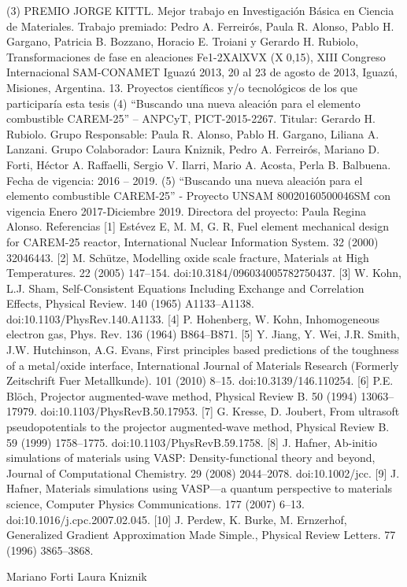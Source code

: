    (3)  PREMIO JORGE KITTL. Mejor trabajo en Investigación Básica en Ciencia de Materiales. Trabajo premiado: Pedro A. Ferreirós, Paula R. Alonso, Pablo H. Gargano, Patricia B. Bozzano, Horacio E. Troiani y Gerardo H. Rubiolo, Transformaciones de fase en aleaciones Fe1-2XAlXVX (X0,15), XIII Congreso Internacional SAM-CONAMET Iguazú 2013, 20 al 23 de agosto de 2013, Iguazú, Misiones, Argentina.
13. Proyectos científicos y/o tecnológicos de los que participaría esta tesis 
    (4) “Buscando una nueva aleación para el elemento combustible CAREM-25” – ANPCyT, PICT-2015-2267. Titular: Gerardo H. Rubiolo. Grupo Responsable: Paula R. Alonso, Pablo H. Gargano, Liliana A. Lanzani. Grupo Colaborador: Laura Kniznik, Pedro A. Ferreirós, Mariano D. Forti, Héctor A. Raffaelli, Sergio V. Ilarri, Mario A. Acosta, Perla B. Balbuena. Fecha de vigencia: 2016 – 2019.
    (5) “Buscando una nueva aleación para el elemento combustible CAREM-25” - Proyecto UNSAM 80020160500046SM con vigencia Enero 2017-Diciembre 2019. Directora del proyecto: Paula Regina Alonso.
       Referencias
[1]	Estévez E, M. M, G. R, Fuel element mechanical design for CAREM-25 reactor, International Nuclear Information System. 32 (2000) 32046443.
[2]	M. Schütze, Modelling oxide scale fracture, Materials at High Temperatures. 22 (2005) 147–154. doi:10.3184/096034005782750437.
[3]	W. Kohn, L.J. Sham, Self-Consistent Equations Including Exchange and Correlation Effects, Physical Review. 140 (1965) A1133–A1138. doi:10.1103/PhysRev.140.A1133.
[4]	P. Hohenberg, W. Kohn, Inhomogeneous electron gas, Phys. Rev. 136 (1964) B864–B871.
[5]	Y. Jiang, Y. Wei, J.R. Smith, J.W. Hutchinson, A.G. Evans, First principles based predictions of the toughness of a metal/oxide interface, International Journal of Materials Research (Formerly Zeitschrift Fuer Metallkunde). 101 (2010) 8–15. doi:10.3139/146.110254.
[6]	P.E. Blöch, Projector augmented-wave method, Physical Review B. 50 (1994) 13063–17979. doi:10.1103/PhysRevB.50.17953.
[7]	G. Kresse, D. Joubert, From ultrasoft pseudopotentials to the projector augmented-wave method, Physical Review B. 59 (1999) 1758–1775. doi:10.1103/PhysRevB.59.1758.
[8]	J. Hafner, Ab-initio simulations of materials using VASP: Density-functional theory and beyond, Journal of Computational Chemistry. 29 (2008) 2044–2078. doi:10.1002/jcc.
[9]	J. Hafner, Materials simulations using VASP—a quantum perspective to materials science, Computer Physics Communications. 177 (2007) 6–13. doi:10.1016/j.cpc.2007.02.045.
[10]	J. Perdew, K. Burke, M. Ernzerhof, Generalized Gradient Approximation Made Simple., Physical Review Letters. 77 (1996) 3865–3868.














Mariano Forti
Laura Kniznik

